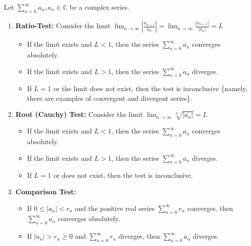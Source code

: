 \begin{proposition} \label{proposition:11.7} Let $\sum_{n=0}^{\infty} a_n, a_n \in \mathbb{C}$ be a complex series.

\begin{enumerate}
    \item \textbf{Ratio-Test:} Consider the limit $\lim_{n \to \infty} \left| \frac{a_{n+1}}{a_n} \right| = \lim_{n \to \infty} \frac{|a_{n+1}|}{|a_n|} = L$
    \begin{itemize}
        \item If the limit exists and $L < 1$, then the series $\sum_{n=0}^{\infty} a_n$ converges absolutely.
        \item If the limit exists and $L > 1$, then the series $\sum_{n=0}^{\infty} a_n$ diverges.
        \item If $L = 1$ or the limit does not exist, then the test is inconclusive \{namely, there are examples of convergent and divergent series\}.
    \end{itemize}
    \item \textbf{Root (Cauchy) Test:} Consider the limit $\lim_{n \to \infty} \sqrt[n]{|a_n|} = L$
    \begin{itemize}
        \item If the limit exists and $L < 1$, then the series $\sum_{n=0}^{\infty} a_n$ converges absolutely.
        \item If the limit exists and $L > 1$, then the series $\sum_{n=0}^{\infty} a_n$ diverges.
        \item If $L = 1$ or does not exist, then the test is inconclusive.
    \end{itemize}
    \item \textbf{Comparison Test:}
    \begin{itemize}
        \item If $0 \leq |a_n| < r_n$ and the positive real series $\sum_{n=0}^{\infty} r_n$ converges, then $\sum_{n=0}^{\infty} a_n$ converges absolutely.
        \item If $|a_n| > r_n \geq 0$ and $\sum_{n=0}^{\infty} r_n$ diverges, then $\sum_{n=0}^{\infty} a_n$ diverges.
    \end{itemize}

\end{enumerate}
\end{proposition}
